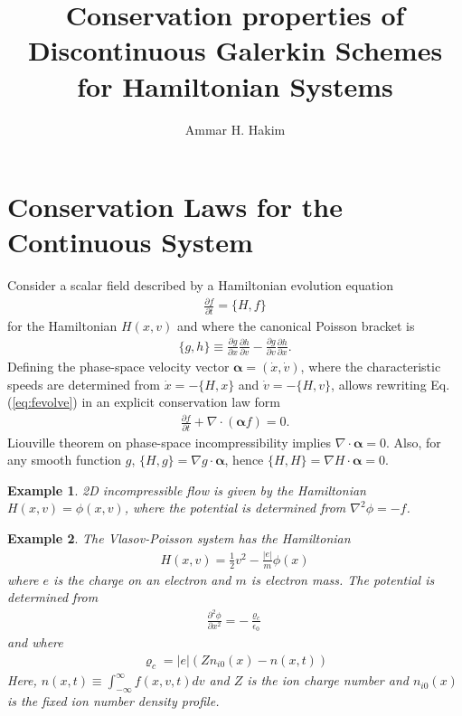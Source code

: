 \documentclass[11pt, reqno]{amsart}
\title[Conservation for Hamiltonian System]{Conservation properties of
  Discontinuous Galerkin Schemes for Hamiltonian Systems}
\author{Ammar H. Hakim}%
\date{}%
\newcommand{\eqr}[1]{Eq.\thinspace(#1)}
\newcommand{\pfrac}[2]{\frac{\partial #1}{\partial #2}}
\newcommand{\gvec}[1]{\boldsymbol{#1}}
\newtheorem{example}{Example}
\theoremstyle{definition}
\begin{document}
%
\maketitle

\section{Conservation Laws for the Continuous System}

Consider a scalar field described by a Hamiltonian evolution equation
\begin{align}
  \pfrac{f}{t} = \{H,f\} \label{eq:fevolve}
\end{align}
for the Hamiltonian $H(x,v)$ and where the canonical Poisson bracket is
\begin{align}
  \{g,h\} \equiv \pfrac{g}{x}\pfrac{h}{v} - \pfrac{g}{v}\pfrac{h}{x}.
\end{align}
Defining the phase-space velocity vector $\gvec{\alpha} = (\dot{x},
\dot{v})$, where the characteristic speeds are determined from
$\dot{x} = -\{H,x\}$ and $\dot{v} = -\{H,v\}$, allows rewriting
\eqr{\ref{eq:fevolve}} in an explicit conservation law form
\begin{align}
  \pfrac{f}{t} + \nabla\cdot\left(\gvec{\alpha}f\right) = 0.
\end{align}
Liouville theorem on phase-space incompressibility implies
$\nabla\cdot\gvec{\alpha} = 0$. Also, for any smooth function $g$,
$\{H,g\} = \nabla g\cdot\gvec{\alpha}$, hence $\{H,H\}=\nabla H \cdot
\gvec{\alpha} = 0$.

\begin{example}
  2D incompressible flow is given by the Hamiltonian $H(x,v)=\phi(x,v)$,
  where the potential is determined from $\nabla^2 \phi = -f$.
\end{example}

\begin{example}
  The Vlasov-Poisson system has the Hamiltonian
  \begin{align}
    H(x,v) = \frac{1}{2}v^2 - \frac{|e|}{m}\phi(x)
  \end{align}
  where $e$ is the charge on an electron and $m$ is electron mass. The
  potential is determined from
  \begin{align}
    \frac{\partial^2 \phi}{\partial x^2} = -\frac{\varrho_c}{\epsilon_0}
  \end{align}
  and where
  \begin{align}
    \varrho_c = |e| \left(Zn_{i0}(x) - n(x,t)\right) \label{eq:vp-poisson}
  \end{align}
  Here, $n(x,t) \equiv \int_{-\infty}^{\infty} f(x,v,t) dv$ and $Z$ is
  the ion charge number and $n_{i0}(x)$ is the fixed ion number density
  profile.
\end{example}
\end{document}
